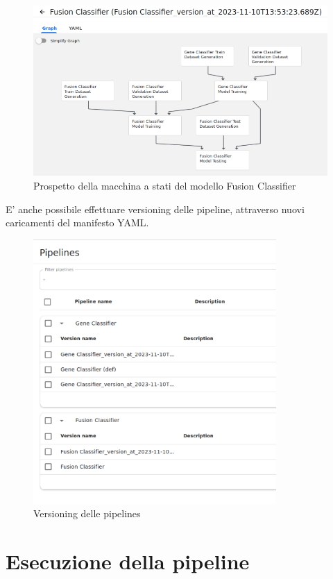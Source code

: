 \begin{figure}[h]
    \centering
    \includegraphics[width=\linewidth]{figures/ch4and5/fusion_stale.png}
    \caption[Prospetto della macchina a stati del modello Fusion Classifier]{Prospetto della macchina a stati del modello Fusion Classifier}
    \label{fig:cha6:fusion_stale}
\end{figure}

E' anche possibile effettuare versioning delle pipeline, attraverso nuovi caricamenti del manifesto YAML.

\begin{figure}[h]
    \centering
    \includegraphics[width=350px]{figures/ch4and5/vers.png}
    \caption[Versioning delle pipelines]{Versioning delle pipelines}
    \label{fig:cha6:versions}
\end{figure}

\section{Esecuzione della pipeline}

